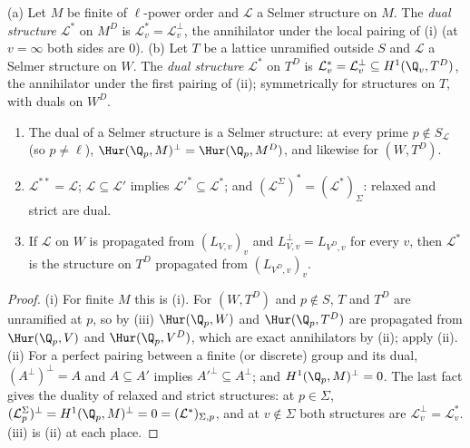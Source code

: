 \begin{definition}\label{def:galcoh:dual-structure}
(a) Let $M$ be finite of $\ell$-power order and $\mathcal L$ a Selmer structure on $M$. The \emph{dual structure} $\mathcal L^*$ on $M^D$ is $\mathcal L^*_v=\mathcal L_v^\perp$, the
annihilator under the local pairing of (i) (at $v=\infty$ both sides are $0$).
(b) Let $T$ be a lattice unramified outside $S$ and $\mathcal L$ a Selmer structure on $W$. The \emph{dual structure} $\mathcal L^*$ on $T^D$ is $\mathcal L^*_v=\mathcal L_v^\perp\subseteq H^1(\Q_v,T^D)$,
the annihilator under the first pairing of (ii); symmetrically for structures on $T$, with duals on $W^D$.
\end{definition}

\begin{proposition}\label{prop:galcoh:dual-structure}
\begin{enumerate}[label=(\roman*)]
\item The dual of a Selmer structure is a Selmer structure: at every prime $p\notin S_{\mathcal L}$ (so $p\ne\ell$), $\Hur(\Q_p,M)^\perp=\Hur(\Q_p,M^D)$, and likewise for
$(W,T^D)$.
\item $\mathcal L^{**}=\mathcal L$; $\mathcal L\subseteq\mathcal L'$ implies $\mathcal L'^*\subseteq\mathcal L^*$; and $(\mathcal L^\Sigma)^*=(\mathcal L^*)_\Sigma$: relaxed and strict are dual.
\item If $\mathcal L$ on $W$ is propagated from $(L_{V,v})_v$ and $L_{V,v}^\perp=L_{V^D,v}$ for every $v$, then $\mathcal L^*$ is the structure on $T^D$ propagated from
$(L_{V^D,v})_v$.
\end{enumerate}
\end{proposition}

\begin{proof}
(i) For finite $M$ this is (i). For $(W,T^D)$ and $p\notin S$, $T$ and $T^D$ are unramified at $p$, so by
(iii) $\Hur(\Q_p,W)$ and $\Hur(\Q_p,T^D)$ are propagated from $\Hur(\Q_p,V)$ and $\Hur(\Q_p,V^D)$, which are exact annihilators by
(ii); apply (ii).
(ii) For a perfect pairing between a finite (or discrete) group and its dual, $(A^\perp)^\perp=A$ and $A\subseteq A'$ implies $A'^\perp\subseteq A^\perp$; and $H^1(\Q_p,M)^\perp=0$.
The last fact gives the duality of relaxed and strict structures: at $p\in\Sigma$, $(\mathcal L^\Sigma_p)^\perp=H^1(\Q_p,M)^\perp=0=(\mathcal L^*)_{\Sigma,p}$, and at $v\notin\Sigma$ both
structures are $\mathcal L_v^\perp=\mathcal L^*_v$.
(iii) is (ii) at each place.
\end{proof}

